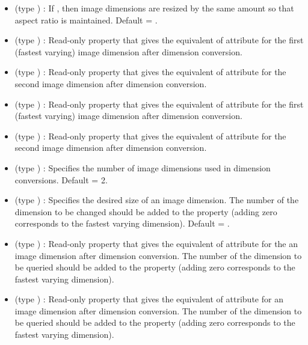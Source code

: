 \begin{itemize}
\item {} (type ) : If ,
then image dimensions are resized by the same amount so that aspect
ratio is maintained. Default = .

\item {} (type ) : Read-only
property that gives the equivalent of attribute  for the
first (fastest varying) image dimension after dimension conversion.

\item {} (type ) : Read-only
property that gives the equivalent of attribute  for the
second image dimension after dimension conversion.

\item {} (type ) : Read-only
property that gives the equivalent of attribute  for the
first (fastest varying) image dimension after dimension conversion.

\item {} (type ) : Read-only
property that gives the equivalent of attribute  for the
second image dimension after dimension conversion.

\item {} (type ) : Specifies the
number of image dimensions used in dimension conversions. Default = 2.

\item {} (type ) : Specifies the
desired size of an image dimension. The number of the dimension to be
changed should be added to the property (adding zero corresponds to
the fastest varying dimension). Default = . 

\item {} (type ) : Read-only
property that gives the equivalent of attribute  for the
an image dimension after dimension conversion. The number of the
dimension to be queried should be added to the property (adding zero
corresponds to the fastest varying dimension). 

\item {} (type ) : Read-only
property that gives the equivalent of attribute  for an
image dimension after dimension conversion. The number of the
dimension to be queried should be added to the property (adding zero
corresponds to the fastest varying dimension). 


\end{itemize}
